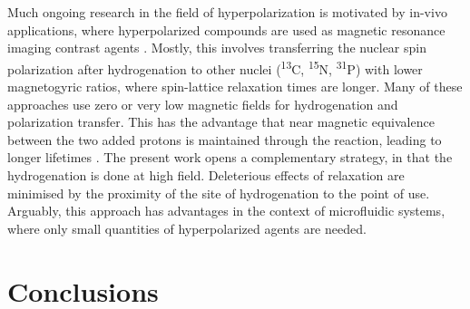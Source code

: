 Much ongoing research in the field of hyperpolarization is
motivated by in-vivo applications, where hyperpolarized compounds
are used as magnetic
resonance imaging contrast agents \cite{Hovener:2018cg}.
Mostly, this involves transferring the
nuclear spin polarization after hydrogenation to other nuclei
(\textsuperscript{13}C, \textsuperscript{15}N, \textsuperscript{31}P) with
lower magnetogyric ratios, where spin-lattice relaxation times are longer.
\cite{Goldman:2005bf,Goldman:2006cp,Reineri:2015he} Many of these approaches
use zero or very low magnetic fields for hydrogenation and polarization
transfer. This has the advantage that near magnetic equivalence between the two
added protons is maintained through the reaction, leading to longer lifetimes
\cite{bhattacharya2007towards,chekmenev2008pasadena,
chekmenev2009hyperpolarized,shchepin2014parahydrogen,
Reineri:2015he,cavallari201813,ripka2018hyperpolarized,roy2018sabre}.
The present work opens a complementary strategy, in that the hydrogenation
is done at high field. Deleterious effects of relaxation are minimised by
the proximity of the site of hydrogenation to the point of use. Arguably,
this approach has advantages in the context of microfluidic systems, where
only small quantities of hyperpolarized agents are needed.

\section{Conclusions}

